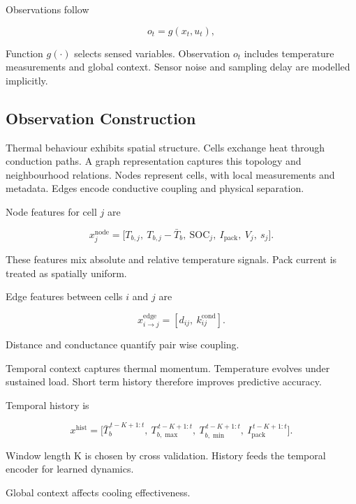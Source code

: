 \documentclass{article}
\begin{document}
Observations follow

\begin{equation}
o_t = g(x_t, u_t),
\end{equation}

Function \(g(\cdot)\) selects sensed variables.
Observation \(o_t\) includes temperature measurements and global context.
Sensor noise and sampling delay are modelled implicitly.

\subsection{Observation Construction}

Thermal behaviour exhibits spatial structure.
Cells exchange heat through conduction paths.
A graph representation captures this topology and neighbourhood relations.
Nodes represent cells, with local measurements and metadata.
Edges encode conductive coupling and physical separation.

Node features for cell \(j\) are

\begin{equation}
x^{\mathrm{node}}_j =
\bigl[T_{b,j},\ T_{b,j}-\bar T_b,\ \mathrm{SOC}_j,\ I_{\mathrm{pack}},\ V_j,\ s_j\bigr].
\end{equation}

These features mix absolute and relative temperature signals.
Pack current is treated as spatially uniform.

Edge features between cells \(i\) and \(j\) are

\begin{equation}
x^{\mathrm{edge}}_{i\to j} =
[d_{ij},\ k^{\mathrm{cond}}_{ij}].
\end{equation}

Distance and conductance quantify pair wise coupling.

Temporal context captures thermal momentum.
Temperature evolves under sustained load.
Short term history therefore improves predictive accuracy.

Temporal history is

\begin{equation}
x^{\mathrm{hist}} =
\bigl[\bar T_b^{\,t-K+1:t},\
T_{b,\max}^{\,t-K+1:t},\
T_{b,\min}^{\,t-K+1:t},\
I_{\mathrm{pack}}^{\,t-K+1:t}\bigr].
\end{equation}

Window length K is chosen by cross validation.
History feeds the temporal encoder for learned dynamics.

Global context affects cooling effectiveness.
\end{document}
